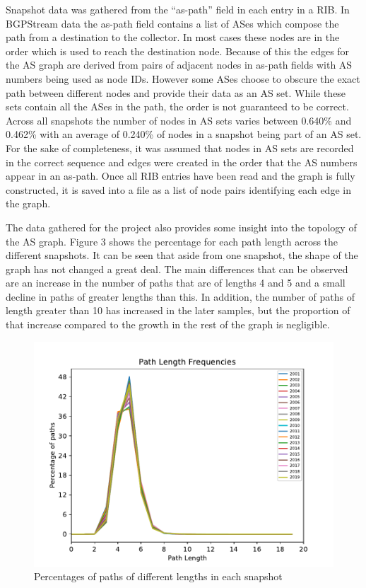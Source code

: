 \documentclass{dissertation/mpaper}
\begin{document}
Snapshot data was gathered from the ``as-path'' field in each entry in a RIB. In BGPStream data the as-path field contains a list of ASes which compose the path from a destination to the collector. In most cases these nodes are in the order which is used to reach the destination node. Because of this the edges for the AS graph are derived from pairs of adjacent nodes in as-path fields with AS numbers being used as node IDs. However some ASes choose to obscure the exact path between different nodes and provide their data as an AS set. While these sets contain all the ASes in the path, the order is not guaranteed to be correct. Across all snapshots the number of nodes in AS sets varies between 0.640\% and 0.462\% with an average of 0.240\% of nodes in a snapshot being part of an AS set. For the sake of completeness, it was assumed that nodes in AS sets are recorded in the correct sequence and edges were created in the order that the AS numbers appear in an as-path. Once all RIB entries have been read and the graph is fully constructed, it is saved into a file as a list of node pairs identifying each edge in the graph.

The data gathered for the project also provides some insight into the topology of the AS graph. Figure 3 shows the percentage for each path length across the different snapshots. It can be seen that aside from one snapshot, the shape of the graph has not changed a great deal. The main differences that can be observed are an increase in the number of paths that are of lengths 4 and 5 and a small decline in paths of greater lengths than this. In addition, the number of paths of length greater than 10 has increased in the later samples, but the proportion of that increase compared to the growth in the rest of the graph is negligible. 

\begin{figure}
    \centering
    \includegraphics{dissertation/images/path-frequencies.pdf}
    \caption{Percentages of paths of different lengths in each snapshot}
    \captionsetup{justification=centering}
\end{figure}
\end{document}
